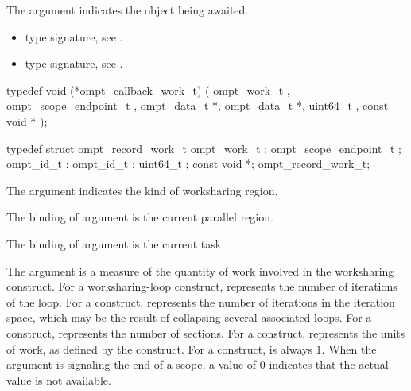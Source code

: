 \argdesc

\epdesc

The argument  indicates the object being awaited.

\codeptrdesc

\crossreferences
\begin{itemize}
\item {} type signature, see
.
\item {} type signature, see
.
\end{itemize}



\label{sec:ompt_callback_work_t}
\format

\begin{ccppspecific}
\begin{omptCallback}
typedef void (*ompt_callback_work_t) (
  ompt_work_t ,
  ompt_scope_endpoint_t ,
  ompt_data_t *,
  ompt_data_t *,
  uint64_t ,
  const void *
);
\end{omptCallback}
\end{ccppspecific}


\record

\begin{ccppspecific}
\begin{omptRecord}
typedef struct ompt_record_work_t {
  ompt_work_t ;
  ompt_scope_endpoint_t ;
  ompt_id_t ;
  ompt_id_t ;
  uint64_t ;
  const void *;
} ompt_record_work_t;
\end{omptRecord}
\end{ccppspecific}


\argdesc

The argument  indicates the kind of worksharing
region.

\epdesc

The binding of argument  is the current
parallel region.

The binding of argument  is the current task.

The argument  is a measure of the quantity of work involved in the worksharing construct.
For a worksharing-loop construct,  represents the number of iterations of the loop.
For a  construct,  represents the number of iterations in the iteration space,
which may be the result of collapsing several associated loops.
For a  construct,  represents the number of sections.
For a  construct,  represents the units of work, as defined by the  construct.
For a  construct,  is always 1.
When the  argument is signaling the end of a scope, a  value of 0 indicates that the actual  value is not available.

